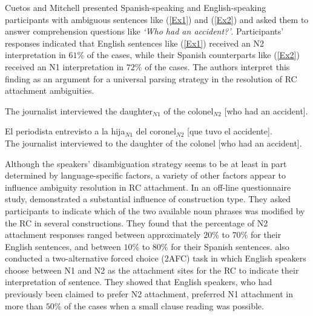 \documentclass[11pt]{article}\usepackage[]{graphicx}\usepackage[]{color}
\begin{document}
Cuetos and Mitchell presented Spanish-speaking and English-speaking participants with ambiguous sentences like (\ref{Ex1}) and (\ref{Ex2}) and asked them to answer comprehension questions like \textit{`Who had an accident?'}. Participants' responses indicated that English sentences like (\ref{Ex1}) received an N2 interpretation in $61\%$ of the cases, while their Spanish counterparts like (\ref{Ex2}) received an N1 interpretation in $72\%$ of the cases. The authors interpret this finding as an argument for a universal parsing strategy in the resolution of RC attachment ambiguities.

\begin{exe}
\ex \label{Ex1} The journalist interviewed the daughter$_{N1}$ of the colonel$_{N2}$ [who had an accident].
\end{exe}

\begin{exe}
\ex \label{Ex2} 
\gll El periodista entrevisto a la hija$_{N1}$ del coronel$_{N2}$ [que tuvo el accidente]. \\
     The journalist interviewed to the daughter {of the} colonel [who had an accident]. \\
\end{exe}

Although the speakers' disambiguation strategy seems to be at least in part determined by language-specific factors, a variety of other factors appear to influence ambiguity resolution in RC attachment.
In an off-line questionnaire study, \citet[inter alia]{GilboyEtAl:1995} demonstrated a substantial influence of construction type. They asked participants to indicate which of the two available noun phrases was modified by the RC in several constructions. They found that the percentage of N2 attachment responses ranged between approximately $20\%$ to $70\%$ for their English sentences, and between $10\%$ to $80\%$ for their Spanish sentences. \citet{GrilloEtAl:2015} also conducted a two-alternative forced choice (2AFC) task in which English speakers choose between N1 and N2 as the attachment sites for the RC to indicate their interpretation of sentence. They showed that English speakers, who had previously been claimed to prefer N2 attachment, preferred N1 attachment in more than $50\%$ of the cases when a small clause reading was possible.
\end{document}
